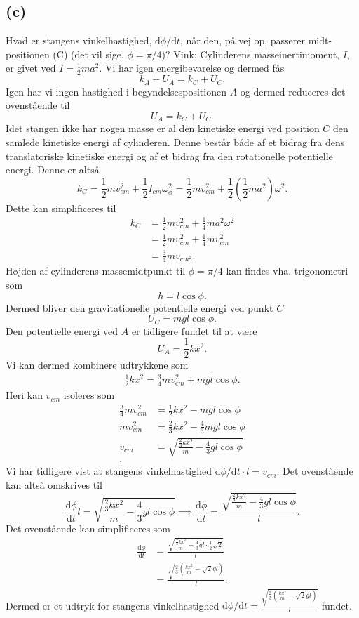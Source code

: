 \documentclass[12pt]{article}
\theoremstyle{definition}
\begin{document}
\subsection*{(c)}
Hvad er stangens vinkelhastighed, $\mathrm{d}\phi / \mathrm{d}t$, når den, på vej op, passerer midt-positionen (C) (det vil sige, $\phi = \pi / 4$)?
Vink: Cylinderens masseinertimoment, $I$, er givet ved $I = \frac{1}{2}ma^2$.
\bigbreak
Vi har igen energibevarelse og dermed fås
\[ 
k_{A} + U_{A} = k_{C} + U_{C}
.\]
Igen har vi ingen hastighed i begyndelsespositionen $A$ og dermed reduceres det ovenstående til
\[ 
U_{A} = k_C + U_C
.\]
Idet stangen ikke har nogen masse er al den kinetiske energi ved position $C$ den samlede kinetiske energi af cylinderen. Denne består både af et bidrag fra dens translatoriske kinetiske energi og af et bidrag fra den rotationelle potentielle energi. Denne er altså
\[ 
k_C = \frac{1}{2}mv_{cm}^2 + \frac{1}{2}I_{cm}\omega_{\phi}^2 = \frac{1}{2}m v_{cm}^2 + \frac{1}{2} \left( \frac{1}{2}ma^2 \right)\omega^2
.\]
Dette kan simplificeres til
\begin{align*}
  k_C &= \frac{1}{2}m v_{cm}^2 + \frac{1}{4}ma^2\omega^2 \\
  &= \frac{1}{2}m v_{cm}^2 + \frac{1}{4}m v_{cm}^2\\
  &= \frac{3}{4} m v_{cm^2}
.\end{align*}
Højden af cylinderens massemidtpunkt til $\phi = \pi / 4$ kan findes vha. trigonometri som
\[ 
h = l \cos\phi
.\]
Dermed bliver den gravitationelle potentielle energi ved punkt $C$
\[ 
U_C = mg l \cos\phi
.\]
Den potentielle energi ved $A$ er tidligere fundet til at være
\[ 
U_A = \frac{1}{2}kx^2
.\]
Vi kan dermed kombinere udtrykkene som
\begin{align*}
  \frac{1}{2}kx^2 = \frac{3}{4}m v_{cm}^2 + mgl \cos\phi
.\end{align*}
Heri kan $v_{cm}$ isoleres som
\begin{align*}
  \frac{3}{4} m v_{cm}^2 &= \frac{1}{2}kx^2 - mgl \cos \phi \\
  m v_{cm}^2 &= \frac{2}{3} kx^2 - \frac{4}{3} mgl \cos \phi \\
  v_{cm} &= \sqrt{\frac{\frac{2}{3}kx^2}{m} - \frac{4}{3}gl \cos\phi} \\
.\end{align*}
Vi har tidligere vist at stangens vinkelhastighed $\mathrm{d}\phi / \mathrm{d}t \cdot l = v_{cm}$. Det ovenstående kan altså omskrives til
\[ 
\frac{\mathrm{d}\phi}{\mathrm{d}t} l = \sqrt{\frac{\frac{2}{3}kx^2}{m} - \frac{4}{3}gl \cos\phi} \implies \frac{\mathrm{d}\phi}{\mathrm{d}t} = \frac{\sqrt{\frac{\frac{2}{3}kx^2}{m} - \frac{4}{3}gl \cos\phi}}{l}
.\]
Det ovenstående kan simplificeres som
\begin{align*}
  \frac{\mathrm{d}\phi}{\mathrm{d}t} &= \frac{\sqrt{\frac{\frac{2}{3}kx^2}{m} - \frac{4}{3}gl \cdot \frac{1}{2} \sqrt{2}}}{l} \\      
  &= \frac{\sqrt{\frac{2}{3}\left( \frac{kx^2}{m} - \sqrt{2}gl \right)}}{l}
.\end{align*}
Dermed er et udtryk for stangens vinkelhastighed \underline{\underline{$\mathrm{d}\phi / \mathrm{d}t = \frac{\sqrt{\frac{2}{3}\left( \frac{kx^2}{m} - \sqrt{2}gl \right)}}{l}$}} fundet.
\end{document}
